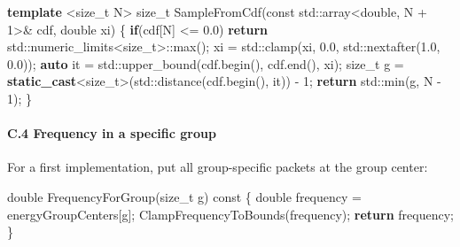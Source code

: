 \documentclass[
]{article}
\newenvironment{Shaded}{}{}
\newcommand{\AttributeTok}[1]{\textcolor[rgb]{0.49,0.56,0.16}{#1}}
\newcommand{\BuiltInTok}[1]{\textcolor[rgb]{0.00,0.50,0.00}{#1}}
\newcommand{\ControlFlowTok}[1]{\textcolor[rgb]{0.00,0.44,0.13}{\textbf{#1}}}
\newcommand{\DataTypeTok}[1]{\textcolor[rgb]{0.56,0.13,0.00}{#1}}
\newcommand{\DecValTok}[1]{\textcolor[rgb]{0.25,0.63,0.44}{#1}}
\newcommand{\FloatTok}[1]{\textcolor[rgb]{0.25,0.63,0.44}{#1}}
\newcommand{\KeywordTok}[1]{\textcolor[rgb]{0.00,0.44,0.13}{\textbf{#1}}}
\newcommand{\NormalTok}[1]{#1}
\newcommand{\OperatorTok}[1]{\textcolor[rgb]{0.40,0.40,0.40}{#1}}
\begin{document}
\begin{Shaded}
\begin{Highlighting}[]
\KeywordTok{template} \OperatorTok{\textless{}}\DataTypeTok{size\_t}\NormalTok{ N}\OperatorTok{\textgreater{}}
\DataTypeTok{size\_t}\NormalTok{ SampleFromCdf}\OperatorTok{(}\AttributeTok{const} \BuiltInTok{std::}\NormalTok{array}\OperatorTok{\textless{}}\DataTypeTok{double}\OperatorTok{,}\NormalTok{ N }\OperatorTok{+} \DecValTok{1}\OperatorTok{\textgreater{}\&}\NormalTok{ cdf}\OperatorTok{,} \DataTypeTok{double}\NormalTok{ xi}\OperatorTok{)}
\OperatorTok{\{}
    \ControlFlowTok{if}\OperatorTok{(}\NormalTok{cdf}\OperatorTok{[}\NormalTok{N}\OperatorTok{]} \OperatorTok{\textless{}=} \FloatTok{0.0}\OperatorTok{)}
        \ControlFlowTok{return} \BuiltInTok{std::}\NormalTok{numeric\_limits}\OperatorTok{\textless{}}\DataTypeTok{size\_t}\OperatorTok{\textgreater{}::}\NormalTok{max}\OperatorTok{();}
\NormalTok{    xi }\OperatorTok{=} \BuiltInTok{std::}\NormalTok{clamp}\OperatorTok{(}\NormalTok{xi}\OperatorTok{,} \FloatTok{0.0}\OperatorTok{,} \BuiltInTok{std::}\NormalTok{nextafter}\OperatorTok{(}\FloatTok{1.0}\OperatorTok{,} \FloatTok{0.0}\OperatorTok{));}
    \KeywordTok{auto}\NormalTok{ it }\OperatorTok{=} \BuiltInTok{std::}\NormalTok{upper\_bound}\OperatorTok{(}\NormalTok{cdf}\OperatorTok{.}\NormalTok{begin}\OperatorTok{(),}\NormalTok{ cdf}\OperatorTok{.}\NormalTok{end}\OperatorTok{(),}\NormalTok{ xi}\OperatorTok{);}
    \DataTypeTok{size\_t}\NormalTok{ g }\OperatorTok{=} \KeywordTok{static\_cast}\OperatorTok{\textless{}}\DataTypeTok{size\_t}\OperatorTok{\textgreater{}(}\BuiltInTok{std::}\NormalTok{distance}\OperatorTok{(}\NormalTok{cdf}\OperatorTok{.}\NormalTok{begin}\OperatorTok{(),}\NormalTok{ it}\OperatorTok{))} \OperatorTok{{-}} \DecValTok{1}\OperatorTok{;}
    \ControlFlowTok{return} \BuiltInTok{std::}\NormalTok{min}\OperatorTok{(}\NormalTok{g}\OperatorTok{,}\NormalTok{ N }\OperatorTok{{-}} \DecValTok{1}\OperatorTok{);}
\OperatorTok{\}}
\end{Highlighting}
\end{Shaded}

\paragraph{C.4 Frequency in a specific
group}\label{c.4-frequency-in-a-specific-group}

For a first implementation, put all group-specific packets at the group
center:

\begin{Shaded}
\begin{Highlighting}[]
\DataTypeTok{double}\NormalTok{ FrequencyForGroup}\OperatorTok{(}\DataTypeTok{size\_t}\NormalTok{ g}\OperatorTok{)} \AttributeTok{const}
\OperatorTok{\{}
    \DataTypeTok{double}\NormalTok{ frequency }\OperatorTok{=}\NormalTok{ energyGroupCenters}\OperatorTok{[}\NormalTok{g}\OperatorTok{];}
\NormalTok{    ClampFrequencyToBounds}\OperatorTok{(}\NormalTok{frequency}\OperatorTok{);}
    \ControlFlowTok{return}\NormalTok{ frequency}\OperatorTok{;}
\OperatorTok{\}}
\end{Highlighting}
\end{Shaded}
\end{document}
